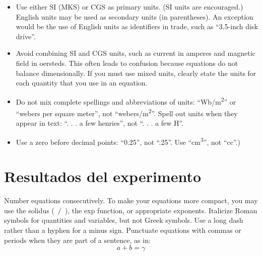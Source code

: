 \documentclass[conference]{IEEEtran}
\begin{document}
\begin{center}
\begin{adjustbox}{width=\columnwidth}
\end{adjustbox}
\end{center}
\begin{itemize}
\item Use either SI (MKS) or CGS as primary units. (SI units are encouraged.) English units may be used as secondary units (in parentheses). An exception would be the use of English units as identifiers in trade, such as ``3.5-inch disk drive''.
\item Avoid combining SI and CGS units, such as current in amperes and magnetic field in oersteds. This often leads to confusion because equations do not balance dimensionally. If you must use mixed units, clearly state the units for each quantity that you use in an equation.
\item Do not mix complete spellings and abbreviations of units: ``Wb/m\textsuperscript{2}'' or ``webers per square meter'', not ``webers/m\textsuperscript{2}''. Spell out units when they appear in text: ``. . . a few henries'', not ``. . . a few H''.
\item Use a zero before decimal points: ``0.25'', not ``.25''. Use ``cm\textsuperscript{3}'', not ``cc''.)
\end{itemize}

\section{Resultados del experimento}
Number equations consecutively. To make your 
equations more compact, you may use the solidus (~/~), the exp function, or 
appropriate exponents. Italicize Roman symbols for quantities and variables, 
but not Greek symbols. Use a long dash rather than a hyphen for a minus 
sign. Punctuate equations with commas or periods when they are part of a 
sentence, as in:
\begin{equation}
a+b=\gamma\label{eq}
\end{equation}
\end{document}
